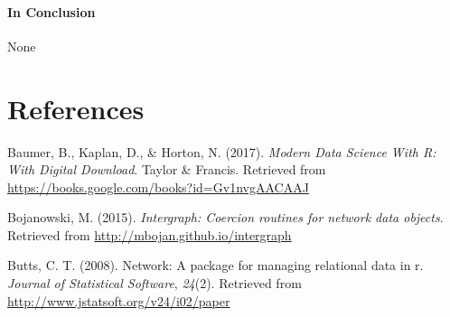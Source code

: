 \documentclass[12pt,twoside]{amherstthesis}
\begin{document}
  \begin{Shaded}
  \begin{Highlighting}[]
  \StringTok{ }\StringTok{ }
  
  \NormalTok{(}\NormalTok{)}
  \StringTok{ }\NormalTok{)}
  
  
  
  \StringTok{ }\StringTok{ }
  
  \NormalTok{(}\NormalTok{)}
  \StringTok{ }\NormalTok{)}
  \end{Highlighting}
  \end{Shaded}
  
  \subsubsection{In Conclusion}\label{in-conclusion}
  
  None
  
  \backmatter
  
  \chapter{References}\label{references}
  
  \noindent
  
  \setlength{\parindent}{-0.20in} \setlength{\leftskip}{0.20in}
  \setlength{\parskip}{8pt}
  
  \hypertarget{refs}{}
  \hypertarget{ref-baumer_modern_2017}{}
  Baumer, B., Kaplan, D., \& Horton, N. (2017). \emph{Modern Data Science
  With R: With Digital Download}. Taylor \& Francis. Retrieved from
  \url{https://books.google.com/books?id=Gv1nvgAACAAJ}
  
  \hypertarget{ref-intergraphpackagemanual}{}
  Bojanowski, M. (2015). \emph{Intergraph: Coercion routines for network
  data objects}. Retrieved from \url{http://mbojan.github.io/intergraph}
  
  \hypertarget{ref-networkpackagearticle}{}
  Butts, C. T. (2008). Network: A package for managing relational data in
  r. \emph{Journal of Statistical Software}, \emph{24}(2). Retrieved from
  \url{http://www.jstatsoft.org/v24/i02/paper}
  
\end{document}
